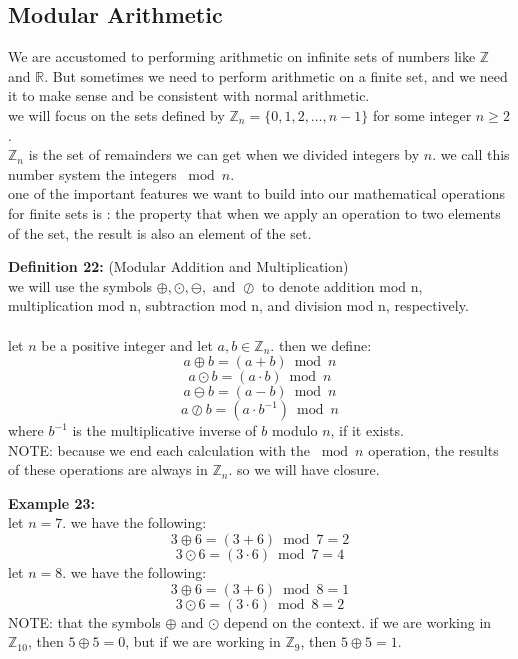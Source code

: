 \documentclass[12pt]{article}
\begin{document}
\subsection{Modular Arithmetic}
We are accustomed to performing arithmetic on infinite sets of numbers like $\mathbb{Z}$ and $\mathbb{R}$. But sometimes we need to perform arithmetic on a finite set, and we need it to make sense and be consistent with normal arithmetic.
\\ we will focus on the sets defined by $\mathbb{Z}_n = \{0,1,2,\dots,n-1\}$ for some integer $n \ge 2$.
\\ $\mathbb{Z}_n$ is the set of remainders we can get when we divided integers by $n$. we call this number system the integers $\bmod{n}$.
\\ one of the important features we want to build into our mathematical operations for finite sets is : the property that when we apply an operation to two elements of the set, the result is also an element of the set.

\newpage

\noindent\textbf{Definition 22:} (Modular Addition and Multiplication)
\\
we will use the symbols $\oplus, \odot, \ominus, \text{ and } \oslash$ to denote addition mod n, multiplication mod n, subtraction mod n, and division mod n, respectively.
\\
\\
let $n$ be a positive integer and let $a,b \in \mathbb{Z}_n$. then we define:
\[a \oplus b = (a + b) \bmod n\]
\[a \odot b = (a \cdot b) \bmod n\]
\[a \ominus b = (a - b) \bmod n\]
\[a \oslash b = (a \cdot b^{-1}) \bmod n\]
where $b^{-1}$ is the multiplicative inverse of $b$ modulo $n$, if it exists.
\\NOTE: because we end each calculation with the $\bmod n$ operation, the results of these operations are always in $\mathbb{Z}_n$.
so we will have closure.

\vspace{5mm}
\noindent\textbf{Example 23:}
\\ let $n=7$. we have the following:
\[3 \oplus 6 = (3+6) \bmod 7 = 2\]
\[3 \odot 6 = (3 \cdot 6) \bmod 7 = 4\]
let $n=8$. we have the following:
\[3 \oplus 6 = (3+6) \bmod 8 = 1\]
\[3 \odot 6 = (3 \cdot 6) \bmod 8 = 2\]
NOTE: that the symbols $\oplus$ and $\odot$ depend on the context. if we are working in $\mathbb{Z}_{10}$, then $5 \oplus 5 =0$, but if we are working in $\mathbb{Z}_{9}$, then $5 \oplus 5 =1$.
\end{document}
